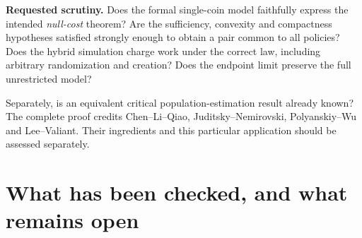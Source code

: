 \documentclass[11pt]{article}
\begin{document}
\noindent\textbf{Requested scrutiny.} Does the formal single-coin model
faithfully express the intended \emph{null-cost} theorem? Are the
sufficiency, convexity and compactness hypotheses satisfied strongly enough
to obtain a pair common to all policies? Does the hybrid simulation charge
work under the correct law, including arbitrary randomization and creation?
Does the endpoint limit preserve the full unrestricted model?

Separately, is an equivalent critical population-estimation result already
known? The complete proof credits Chen--Li--Qiao, Juditsky--Nemirovski,
Polyanskiy--Wu and Lee--Valiant. Their ingredients and this particular
application should be assessed separately.

\clearpage
\begingroup\small
\section*{What has been checked, and what remains open}
\end{document}
